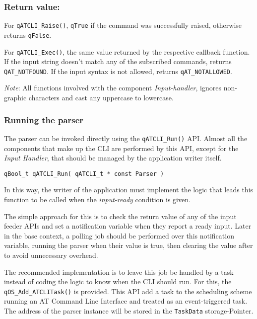 \subsubsection*{Return value:}
For \lstinline{qATCLI_Raise()}, \lstinline{qTrue} if the command was successfully raised, otherwise returns \lstinline{qFalse}.

For \lstinline{qATCLI_Exec()}, the same value returned by the respective callback function. If the input string doesn't match any of the subscribed commands, returns \lstinline{QAT_NOTFOUND}. If the input syntax is not allowed, returns \lstinline{qAT_NOTALLOWED}. \\

\begin{tcolorbox}
\ArrowBoldDownRight \textit{Note}: All functions involved with the component \textit{Input-handler},  ignores non-graphic characters and cast any uppercase to lowercase.
\end{tcolorbox}

\subsubsection{Running the parser} \label{runningparser}
The parser can be invoked directly using the \lstinline{qATCLI_Run()}  API. Almost all the components that make up the CLI are performed by this API, except for the \textit{Input Handler}, that should be managed by the application writer itself. \\

\begin{lstlisting}[style=CStyle]
qBool_t qATCLI_Run( qATCLI_t * const Parser )
\end{lstlisting}

In this way, the writer of the application must implement the logic that leads this function to be called when the \textit{input-ready} condition is given.

The simple approach for this is to check the return value of any of the input feeder APIs and set a notification variable when they report a ready input. Later in the base context, a polling job should be performed over this notification variable, running the parser when their value is true, then clearing the value after to avoid unnecessary overhead. 

The recommended implementation is to leave this job be handled by a task instead of coding the logic to know when the CLI should run. For this, the \lstinline{qOS_Add_ATCLITask()} is provided. This API  add a task to the scheduling scheme running an AT Command Line Interface and treated as an event-triggered task. The address of the parser instance will be stored in the \lstinline{TaskData} storage-Pointer. \\

